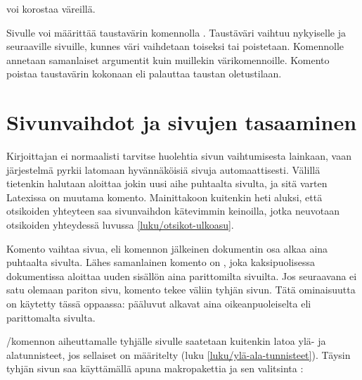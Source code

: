 \begin{tulossis}
   \setlength{\fboxrule}{2bp}
  \textcolor{pun}{voi korostaa} \colorbox{pun}{väreillä}.
\end{tulossis}

Sivulle voi määrittää taustavärin komennolla .
Taustäväri vaihtuu nykyiselle ja seuraaville sivuille, kunnes väri
vaihdetaan toiseksi tai poistetaan. Komennolle annetaan samanlaiset
argumentit kuin muillekin värikomennoille. Komento
 poistaa taustavärin kokonaan eli palauttaa
taustan oletustilaan.

\begin{koodilohkosis}
\pagecolor{nimi} %
\pagecolor[värimalli]{parametrit}
\nopagecolor
\end{koodilohkosis}

\section{Sivunvaihdot ja sivujen tasaaminen}
\label{luku/sivunvaihdot}

Kirjoittajan ei normaalisti tarvitse huolehtia sivun vaihtumisesta
lainkaan, vaan järjestelmä pyrkii latomaan hyvännäköisiä sivuja
automaattisesti. Välillä tietenkin halutaan aloittaa jokin uusi aihe
puhtaalta sivulta, ja sitä varten Latexissa on muutama komento.
Mainittakoon kuitenkin heti aluksi, että otsikoiden yhteyteen saa
sivunvaihdon kätevimmin keinoilla, jotka neuvotaan otsikoiden yhteydessä
luvussa \ref{luku/otsikot-ulkoasu}.

Komento  vaihtaa sivua, eli komennon jälkeinen
dokumentin osa alkaa aina puhtaalta sivulta. Lähes samanlainen komento
on , joka kaksipuolisessa dokumentissa
aloittaa uuden sisällön aina parittomilta sivuilta. Jos seuraavana ei
satu olemaan pariton sivu, komento tekee väliin tyhjän sivun. Tätä
ominaisuutta on käytetty tässä oppaassa: pääluvut alkavat aina
oikeanpuoleiselta eli parittomalta sivulta.

\-/komennon aiheuttamalle tyhjälle sivulle
saatetaan kuitenkin latoa ylä- ja alatunnisteet, jos sellaiset on
määritelty (luku \ref{luku/ylä-ala-tunnisteet}). Täysin tyhjän sivun saa
käyttämällä apuna makropakettia  ja
sen valitsinta :

\begin{koodilohkosis}
\usepackage[clearempty]{titlesec}
\end{koodilohkosis}


